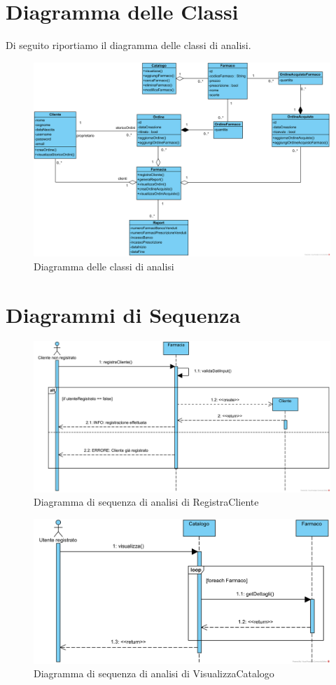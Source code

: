 \pagebreak

\section{Diagramma delle Classi}
Di seguito riportiamo il diagramma delle classi di analisi.
\begin{figure}[!ht]
	\centering
	\includegraphics[width=\linewidth]{assets/ClassDiagramAnalisi.png}
	\caption{Diagramma delle classi di analisi}
\end{figure}

\section{Diagrammi di Sequenza}

\begin{figure}[!hbp]
	\centering
	\includegraphics[width=0.8\linewidth]{assets/sequence_analisi/SequenceAnalisiRegistraCliente.png}
	\caption{Diagramma di sequenza di analisi di RegistraCliente}
\end{figure}

\begin{figure}[!hbp]
	\centering
	\includegraphics[width=0.8\linewidth]{assets/sequence_analisi/SequenceAnalisiVisualizzaCatalogo.png}
	\caption{Diagramma di sequenza di analisi di VisualizzaCatalogo}
\end{figure}

